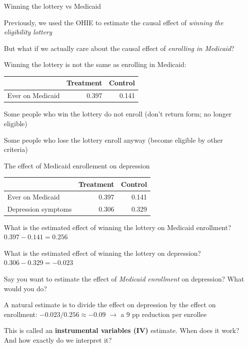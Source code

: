 \documentclass[11pt,english,handout]{beamer}
\newenvironment{wideitemize}{\itemize\addtolength{\itemsep}{10pt}}{\enditemize}
\begin{document}
	\begin{frame}{Winning the lottery vs Medicaid}
		\begin{wideitemize}
			\item
			Previously, we used the OHIE to estimate the causal effect of \textit{winning the eligibility lottery} \\
			
			\item
			But what if we actually care about the causal effect of \textit{enrolling in Medicaid}? 
			
			\pause
			\item
			Winning the lottery is not the same as enrolling in Medicaid: \medskip
			
			\begin{tabular}{lrr}
				& Treatment & Control \\ \hline
				Ever on Medicaid & 0.397 & 0.141
			\end{tabular}
			
			\pause
			\item
			Some people who win the lottery do not enroll (don't return form; no longer eligible)
			
			
			\item
			Some people who lose the lottery enroll anyway (become eligible by other criteria)
		\end{wideitemize}
	\end{frame}


	\begin{frame}{The effect of Medicaid enrollement on depression}
		
			\begin{tabular}{lrr}
			& Treatment & Control \\ \hline
			Ever on Medicaid & 0.397 & 0.141 \\
		   Depression symptoms & 0.306 &  0.329 
		   \end{tabular}
	
	
	\begin{wideitemize}
		\item
		What is the estimated effect of winning the lottery on Medicaid enrollment? \pause $0.397-0.141 = 0.256$
		
		\pause
		\item
		What is the estimated effect of winning the lottery on depression? \pause $0.306 - 0.329 = -0.023$
		
		\pause
		\item
		Say you want to estimate the effect of \textit{Medicaid enrollment} on depression? What would you do?
		
		\pause
		\item
		A natural estimate is to divide the effect on depression by the effect on enrollment: $-0.023 / 0.256 \approx -0.09$ $\rightarrow$ a 9 pp reduction per enrollee
		
		\pause
		\item
		This is called an \textbf{instrumental variables (IV)} estimate. When does it work? And how exactly do we interpret it?
	\end{wideitemize}
	
	\end{frame}
\end{document}
